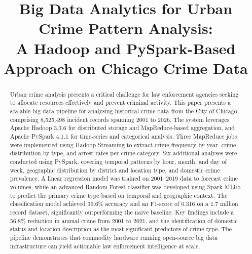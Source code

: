 \documentclass[conference]{IEEEtran}
\begin{document}
\title{Big Data Analytics for Urban Crime Pattern Analysis:\\
A Hadoop and PySpark-Based Approach on Chicago Crime Data}

\author{
\and
{}
\and
{}
}

\maketitle

\begin{abstract}
Urban crime analysis presents a critical challenge for law enforcement agencies seeking
to allocate resources effectively and prevent criminal activity. This paper presents a
scalable big data pipeline for analysing historical crime data from the City of Chicago,
comprising 8,525,498 incident records spanning 2001 to 2026. The system leverages
Apache Hadoop 3.3.6 for distributed storage and MapReduce-based aggregation, and
Apache PySpark 4.1.1 for time-series and categorical analysis. Three MapReduce jobs
were implemented using Hadoop Streaming to extract crime frequency by year, crime
distribution by type, and arrest rates per crime category. Six additional analyses were
conducted using PySpark, covering temporal patterns by hour, month, and day of week,
geographic distribution by district and location type, and domestic crime prevalence.
A linear regression model was trained on 2001--2019 data to forecast crime volumes,
while an advanced Random Forest classifier was developed using Spark MLlib to
predict the primary crime type based on temporal and geographic context. The
classification model achieved 39.6\% accuracy and an F1-score of 0.316 on a 1.7 million
record dataset, significantly outperforming the naive baseline. Key findings include
a 56.8\% reduction in annual crime from 2001 to 2021, and the identification of
domestic status and location description as the most significant predictors of
crime type. The pipeline demonstrates that commodity hardware running open-source
big data infrastructure can yield actionable law enforcement intelligence at scale.
\end{abstract}
\end{document}
